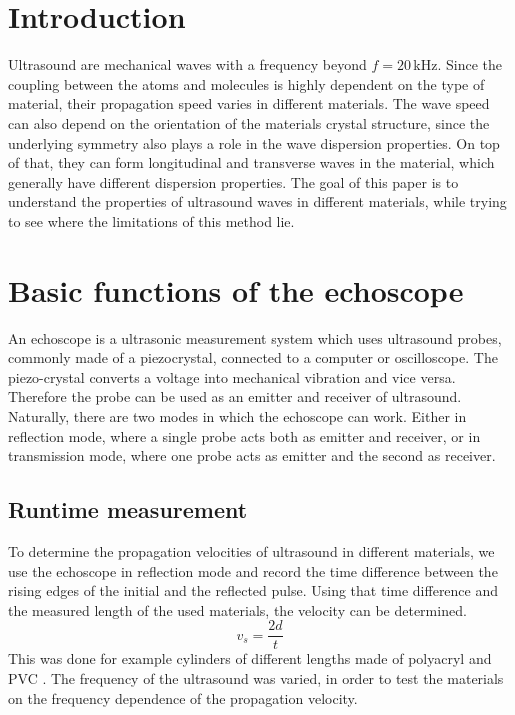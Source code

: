 \documentclass[a4paper,10pt,twocolumn]{article}
\begin{document}
    
    
    \section{Introduction}\label{sec:introdction}
    Ultrasound are mechanical waves with a frequency beyond $f = 20\,$kHz.
    Since the coupling between the atoms and molecules is highly dependent on the type of material, their propagation speed varies in different materials.
    The wave speed can also depend on the orientation of the materials crystal structure, since the underlying symmetry also plays a role in the wave dispersion properties.
    On top of that, they can form longitudinal and transverse waves in the material, which generally have different dispersion properties.
    The goal of this paper is to understand the properties of ultrasound waves in different materials, while trying to see where the limitations of this method lie.
    
    
    
    \section{Basic functions of the echoscope}\label{sec:BasicFunctions}
    An echoscope is a ultrasonic measurement system which uses ultrasound probes, commonly made of a piezocrystal, connected to a computer or oscilloscope.
    The piezo-crystal converts a voltage into mechanical vibration and vice versa.
    Therefore the probe can be used as an emitter and receiver of ultrasound.
    Naturally, there are two modes in which the echoscope can work.
    Either in reflection mode, where a single probe acts both as emitter and receiver, or in transmission mode, where one probe acts as emitter and the second as receiver.
    
    \subsection{Runtime measurement}\label{subsec:RuntimeMeasurement}
    To determine the propagation velocities of ultrasound in different materials, we use the echoscope in reflection mode and record the time difference between the 
    rising edges of the initial and the reflected pulse.
    Using that time difference and the measured length of the used materials, the velocity can be determined.
    \begin{equation}
        v_s = \frac{2d}{t}
    \end{equation}
    This was done for example cylinders of different lengths made of polyacryl and PVC .
    The frequency of the ultrasound was varied, in order to test the materials on the frequency dependence of the propagation velocity.
\end{document}
